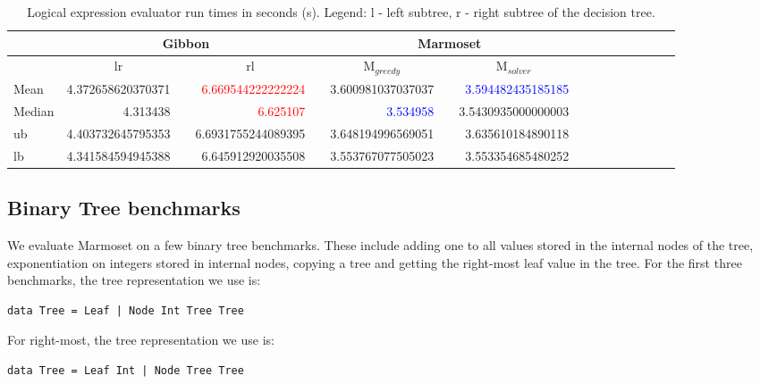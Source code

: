 \documentclass[acmsmall,review,anonymous]{acmart}\settopmatter{printfolios=true,printccs=false,printacmref=false}
\newcommand{\system}{{\sc Marmoset}\xspace}
\newcommand{\systemSolver}{{\sc M$_{\mathit{solver}}$}\xspace}
\newcommand{\systemGreedy}{{\sc M$_{\mathit{greedy}}$}\xspace}
\newcommand{\gibbon}{{\sc Gibbon}\xspace}
\newcommand{\ra}[1]{\renewcommand{\arraystretch}{#1}}
\newcommand{\fnumthree}[1]{ {\num[round-mode=places,round-precision=3, scientific-notation=false]{#1}}}
\begin{document}
\begin{table}[]
	\setlength{\tabcolsep}{2pt} \centering
	\ra{1}
	\caption{Logical expression evaluator run times in seconds (s).
	Legend: l - left subtree, r - right subtree  of the decision tree.}
	\begin{tabular}{@{}p{0.6in}rcrcrcrcrcrcrcr@{}}\toprule
	 & \multicolumn{3}{|c|}{{\gibbon}} &
	 & \multicolumn{3}{c|}{{\system}}\\ \midrule

	 & \multicolumn{1}{c}{{lr}} & 
	 & \multicolumn{1}{c}{{rl}} &
	 & \multicolumn{1}{c}{\small{\systemGreedy}} &
	 & \multicolumn{1}{c}{\small{\systemSolver}}\\ \midrule
	Mean
	         &   \fnumthree{4.372658620370371}
			 &&   \textcolor{red}{\fnumthree{6.669544222222224}}
			 &&   \fnumthree{3.600981037037037}
			 &&   \textcolor{blue}{\fnumthree{3.594482435185185}}

			\\
	Median
	        &  \fnumthree{4.313438}
			&&   \textcolor{red}{\fnumthree{6.625107}}
			&&    \textcolor{blue}{\fnumthree{3.534958}}
			&&  {\fnumthree{3.5430935000000003}}

			\\
ub          
	               &    \fnumthree{4.403732645795353}
				   &&    \fnumthree{6.6931755244089395}
				   &&    \fnumthree{3.648194996569051}
				   &&    \fnumthree{3.635610184890118}

				   \\
	lb         
	               &    \fnumthree{4.341584594945388}
				   &&    \fnumthree{6.645912920035508}
				   &&    \fnumthree{3.553767077505023}
				   &&    \fnumthree{3.553354685480252}
				   \\
	\bottomrule
	\end{tabular}
	\label{table:Logical-Expression-Evaluator}
\end{table}


\subsection{Binary Tree benchmarks}\label{subsec:trees}

We evaluate \system on a few binary tree benchmarks. These include adding one to all values stored in the internal nodes of the tree, exponentiation on integers stored in internal nodes, copying a tree and getting the right-most leaf value in the tree.
For the first three benchmarks, the tree representation we use is:
\begin{lstlisting}[]
data Tree = Leaf | Node Int Tree Tree
\end{lstlisting}
For right-most, the tree representation we use is:
\begin{lstlisting}[]
data Tree = Leaf Int | Node Tree Tree
\end{lstlisting}
\end{document}
